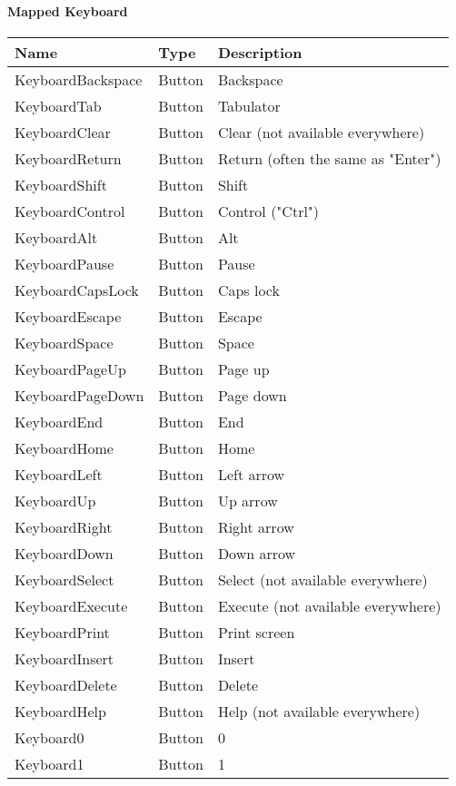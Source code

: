 \paragraph{Mapped Keyboard}
\begin{center}
	\centering
	\begin{longtable}{ | l | l | p{9cm} |}
	\hline
	Name					&	Type	&	Description \\ \hline
	KeyboardBackspace		&	Button	&	Backspace\\
	KeyboardTab				&	Button	&	Tabulator\\
	KeyboardClear			&	Button	&	Clear (not available everywhere)\\
	KeyboardReturn			&	Button	&	Return (often the same as "Enter")\\
	KeyboardShift			&	Button	&	Shift\\
	KeyboardControl			&	Button	&	Control ("Ctrl")\\
	KeyboardAlt				&	Button	&	Alt\\
	KeyboardPause			&	Button	&	Pause\\
	KeyboardCapsLock		&	Button	&	Caps lock\\
	KeyboardEscape			&	Button	&	Escape\\
	KeyboardSpace			&	Button	&	Space\\
	KeyboardPageUp			&	Button	&	Page up\\
	KeyboardPageDown		&	Button	&	Page down\\
	KeyboardEnd				&	Button	&	End\\
	KeyboardHome			&	Button	&	Home\\
	KeyboardLeft			&	Button	&	Left arrow\\
	KeyboardUp				&	Button	&	Up arrow\\
	KeyboardRight			&	Button	&	Right arrow\\
	KeyboardDown			&	Button	&	Down arrow\\
	KeyboardSelect			&	Button	&	Select (not available everywhere)\\
	KeyboardExecute			&	Button	&	Execute (not available everywhere)\\
	KeyboardPrint			&	Button	&	Print screen\\
	KeyboardInsert			&	Button	&	Insert\\
	KeyboardDelete			&	Button	&	Delete\\
	KeyboardHelp			&	Button	&	Help (not available everywhere)\\
	Keyboard0				&	Button	&	0\\
	Keyboard1				&	Button	&	1\\

\end{longtable}
\end{center}
